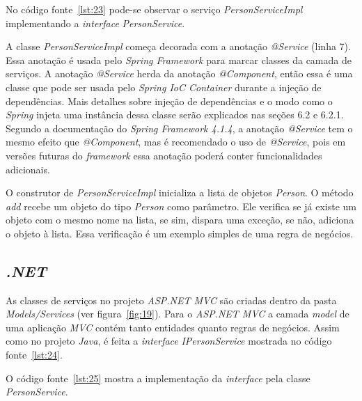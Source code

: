 
No código fonte~\ref{lst:23} pode-se observar o serviço \textit{PersonServiceImpl} implementando a \textit{interface} \textit{PersonService}.


A classe \textit{PersonServiceImpl} começa decorada com a anotação \textit{@Service} (linha 7). Essa anotação é usada pelo \textit{Spring Framework} para marcar classes da camada de serviços. A anotação \textit{@Service} herda da anotação \textit{@Component}, então essa é uma classe que pode ser usada pelo \textit{Spring IoC Container} durante a injeção de dependências. Mais detalhes sobre injeção de dependências e o modo como o \textit{Spring} injeta uma instância dessa classe serão explicados nas seções 6.2 e 6.2.1. Segundo a documentação do \textit{Spring Framework 4.1.4}, a anotação \textit{@Service} tem o mesmo efeito que \textit{@Component}, mas é recomendado o uso de \textit{@Service}, pois em versões futuras do \textit{framework} essa anotação poderá conter funcionalidades adicionais.

O construtor de \textit{PersonServiceImpl} inicializa a lista de objetos \textit{Person}. O método \textit{add} recebe um objeto do tipo \textit{Person} como parâmetro. Ele verifica se já existe um objeto com o mesmo nome na lista, se sim, dispara uma exceção, se não, adiciona o objeto à lista. Essa verificação é um exemplo simples de uma regra de negócios.

\subsection{\textit{.NET}}

As classes de serviços no projeto \textit{ASP.NET MVC} são criadas dentro da pasta \textit{Models/Services} (ver figura~\ref{fig:19}). Para o \textit{ASP.NET MVC} a camada \textit{model} de uma aplicação \textit{MVC} contém tanto entidades quanto regras de negócios. Assim como no projeto \textit{Java}, é feita a \textit{interface} \textit{IPersonService} mostrada no código fonte~\ref{lst:24}.


O código fonte~\ref{lst:25} mostra a implementação da \textit{interface} pela classe \textit{PersonService}.


